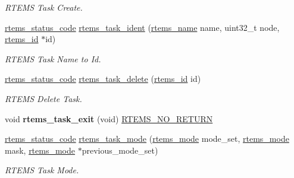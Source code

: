 \begin{DoxyCompactItemize}
\begin{DoxyCompactList}\small\item\em R\+T\+E\+MS Task Create. \end{DoxyCompactList}\item 
\mbox{\hyperlink{group__ClassicStatus_ga545d41846817eaba6143d52ee4d9e9fe}{rtems\+\_\+status\+\_\+code}} \mbox{\hyperlink{group__ClassicTasks_ga9a353585426bfe736693749fb8891daa}{rtems\+\_\+task\+\_\+ident}} (\mbox{\hyperlink{group__ClassicTasks_ga55fb63c49f68c0cbd9bee004da15b1fd}{rtems\+\_\+name}} name, uint32\+\_\+t node, \mbox{\hyperlink{group__ClassicTasks_gab20892b814dced7dd4e5b9bf42becd57}{rtems\+\_\+id}} $\ast$id)
\begin{DoxyCompactList}\small\item\em R\+T\+E\+MS Task Name to Id. \end{DoxyCompactList}\item 
\mbox{\hyperlink{group__ClassicStatus_ga545d41846817eaba6143d52ee4d9e9fe}{rtems\+\_\+status\+\_\+code}} \mbox{\hyperlink{group__ClassicTasks_gaf7c82a7fa13338a65583dc3d760ad9cc}{rtems\+\_\+task\+\_\+delete}} (\mbox{\hyperlink{group__ClassicTasks_gab20892b814dced7dd4e5b9bf42becd57}{rtems\+\_\+id}} id)
\begin{DoxyCompactList}\small\item\em R\+T\+E\+MS Delete Task. \end{DoxyCompactList}\item 
\mbox{\label{group__ClassicTasks_ga80b90aa7c4e3e500fbbdb5de992a805b}} 
void {\bfseries rtems\+\_\+task\+\_\+exit} (void) \mbox{\hyperlink{group__RTEMSScoreBaseDefs_gaa2f0ed67aa174f684bb31b7e8bdb386f}{R\+T\+E\+M\+S\+\_\+\+N\+O\+\_\+\+R\+E\+T\+U\+RN}}
\item 
\mbox{\hyperlink{group__ClassicStatus_ga545d41846817eaba6143d52ee4d9e9fe}{rtems\+\_\+status\+\_\+code}} \mbox{\hyperlink{group__ClassicTasks_gad74c115e94d1f65c416444b36bf012bf}{rtems\+\_\+task\+\_\+mode}} (\mbox{\hyperlink{group__ClassicModes_ga8d46a41a837840dc97336fdcd20e4f68}{rtems\+\_\+mode}} mode\+\_\+set, \mbox{\hyperlink{group__ClassicModes_ga8d46a41a837840dc97336fdcd20e4f68}{rtems\+\_\+mode}} mask, \mbox{\hyperlink{group__ClassicModes_ga8d46a41a837840dc97336fdcd20e4f68}{rtems\+\_\+mode}} $\ast$previous\+\_\+mode\+\_\+set)
\begin{DoxyCompactList}\small\item\em R\+T\+E\+MS Task Mode. \end{DoxyCompactList}\item 

\end{DoxyCompactItemize}
